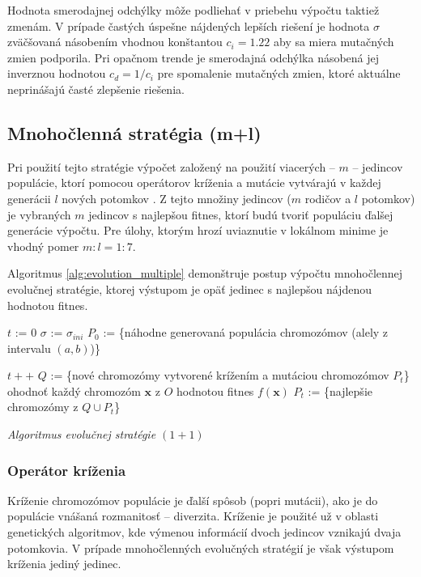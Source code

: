 \documentclass[12pt, a4paper]{article}
\providecommand{\dontprintsemicolon}{\DontPrintSemicolon}
\begin{document}
Hodnota smerodajnej odchýlky môže podliehať v priebehu výpočtu taktiež zmenám. V prípade častých úspešne nájdených lepších riešení je hodnota $\sigma$ zväčšovaná násobením vhodnou konštantou $c_i = 1.22$ aby sa miera mutačných zmien podporila. Pri opačnom trende je smerodajná odchýlka násobená jej inverznou hodnotou $c_d = 1/c_i$ pre spomalenie mutačných zmien, ktoré aktuálne neprinášajú časté zlepšenie riešenia.

\subsection{Mnohočlenná stratégia (m+l)}

Pri použití tejto stratégie výpočet založený na použití viacerých  -- $m$ -- jedincov populácie, ktorí pomocou operátorov kríženia a mutácie vytvárajú v každej generácii $l$ nových potomkov \cite{kvasnicka}. Z tejto množiny jedincov ($m$ rodičov a $l$ potomkov) je vybraných $m$ jedincov s najlepšou fitnes, ktorí budú tvoriť populáciu ďalšej generácie výpočtu. Pre úlohy, ktorým hrozí uviaznutie v lokálnom minime je vhodný pomer $m:l = 1:7$.

Algoritmus \ref{alg:evolution_multiple} demonštruje postup výpočtu mnohočlennej evolučnej stratégie, ktorej výstupom je opäť jedinec s najlepšou nájdenou hodnotou fitnes.

\begin{algorithm}[h]
	\dontprintsemicolon
	\BlankLine
	
	$t$ := $0$\;
	$\sigma$ := $\sigma_{ini}$\;
	$P_0$ := \{náhodne generovaná populácia chromozómov (alely z intervalu $(a,b)$)\}\;
	
	{
		$t++$\;
		$Q$ := \{nové chromozómy vytvorené krížením a mutáciou chromozómov $P_t$\}\;
		ohodnoť každý chromozóm $\mathbf{x}$ z $O$ hodnotou fitnes $f(\mathbf{x})$\;
		$P_t$ := \{najlepšie chromozómy z $Q \cup P_t$\}\;
	}

	\caption{\emph{Algoritmus evolučnej stratégie $(1+1)$} \cite{kvasnicka}\label{alg:evolution_multiple}}
\end{algorithm} 

\subsubsection{Operátor kríženia}
Kríženie chromozómov populácie je ďalší spôsob (popri mutácii), ako je do populácie vnášaná rozmanitosť -- diverzita. Kríženie je použité už v oblasti genetických algoritmov, kde výmenou informácií dvoch jedincov vznikajú dvaja potomkovia. V prípade mnohočlenných evolučných stratégií je však výstupom kríženia jediný jedinec.
\end{document}
